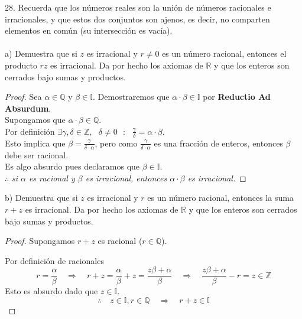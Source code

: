 \documentclass{article}
\begin{document}
  
  28. Recuerda que los números reales son la unión de números racionales e irracionales, y que estos dos conjuntos son ajenos, es decir, no comparten elementos en común (su intersección es vacía). \\\\
  
  a) Demuestra que si \(z\) es irracional y \(r\neq 0\) es un número racional, entonces el producto \(rz\) es irracional. Da por hecho los axiomas de \(\mathbb{R}\) y que los enteros son cerrados bajo sumas y productos.
  \begin{proof}
  Sea $\alpha \in \mathbb{Q}$ y $\beta \in \mathbb{I}$. Demostraremos que $\alpha \cdot \beta \in \mathbb{I}$ por \textbf{Reductio Ad Absurdum}. \\
Supongamos que $\alpha \cdot \beta \in \mathbb{Q}$.\\
Por definición $\exists \gamma,\delta \in \mathbb{Z},\textit{ } \delta \neq 0 \textit{  } : \textit{  } \frac{\gamma}{\delta} = \alpha \cdot \beta$.\\
Esto implica que $\beta = \frac{\gamma}{\delta \cdot \alpha}$, pero como $\frac{\gamma}{\delta \cdot \alpha}$ es una fracción de enteros, entonces $\beta$ debe ser racional.\\
Es algo absurdo pues declaramos que $\beta \in \mathbb{I}$.\\
$\therefore$ \textit{si $\alpha$ es racional y $\beta$ es irracional, entonces $\alpha \cdot \beta$ es irracional.}
\end{proof}

  b) Demuestra que si \(z\) es irracional y \(r\) es un número racional, entonces la suma \(r+z\) es irracional. Da por hecho los axiomas de \(\mathbb{R}\) y que los enteros son cerrados bajo sumas y productos.
\begin{proof}
Supongamos $r + z$ es racional ($r \in \mathbb{Q}$).

Por definición de racionales
$$ r = \frac{\alpha}{\beta} \quad \Rightarrow \quad r + z = \frac{\alpha}{\beta} + z = \frac{z \beta + \alpha}{\beta} \quad \Rightarrow \quad \frac{z \beta + \alpha}{\beta} - r = z \in \mathbb{Z} $$
Esto es absurdo dado que $z \in \mathbb{I}$.
\[ \therefore \quad z \in \mathbb{I}, r \in \mathbb{Q} \quad \Rightarrow \quad r + z \in \mathbb{I} \]
\end{proof}
\end{document}

